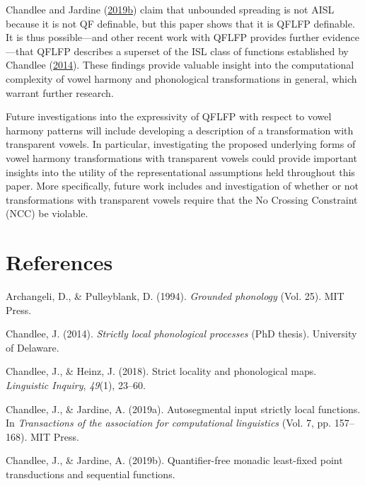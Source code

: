 \documentclass[,doc,floatsintext]{apa6}
\theoremstyle{definition}
\theoremstyle{definition}
\theoremstyle{definition}
\theoremstyle{remark}
\begin{document}
Chandlee and Jardine
(\protect\hyperlink{ref-chandleejardine2019}{2019}\protect\hyperlink{ref-chandleejardine2019}{b})
claim that unbounded spreading is not AISL because it is not QF
definable, but this paper shows that it is QFLFP definable. It is thus
possible---and other recent work with QFLFP provides further
evidence---that QFLFP describes a superset of the ISL class of functions
established by Chandlee (\protect\hyperlink{ref-chandlee2014}{2014}).
These findings provide valuable insight into the computational
complexity of vowel harmony and phonological transformations in general,
which warrant further research.

Future investigations into the expressivity of QFLFP with respect to
vowel harmony patterns will include developing a description of a
transformation with transparent vowels. In particular, investigating the
proposed underlying forms of vowel harmony transformations with
transparent vowels could provide important insights into the utility of
the representational assumptions held throughout this paper. More
specifically, future work includes and investigation of whether or not
transformations with transparent vowels require that the No Crossing
Constraint (NCC) be violable.

\newpage

\section{References}\label{references}

\begingroup
\setlength{\parindent}{-0.5in} \setlength{\leftskip}{0.5in}

\hypertarget{refs}{}
\hypertarget{ref-archangelipulleyblank1994}{}
Archangeli, D., \& Pulleyblank, D. (1994). \emph{Grounded phonology}
(Vol. 25). MIT Press.

\hypertarget{ref-chandlee2014}{}
Chandlee, J. (2014). \emph{Strictly local phonological processes}
(PhD thesis). University of Delaware.

\hypertarget{ref-chandleeheinz2018}{}
Chandlee, J., \& Heinz, J. (2018). Strict locality and phonological
maps. \emph{Linguistic Inquiry}, \emph{49}(1), 23--60.

\hypertarget{ref-chandleejardineaisl}{}
Chandlee, J., \& Jardine, A. (2019a). Autosegmental input strictly local
functions. In \emph{Transactions of the association for computational
linguistics} (Vol. 7, pp. 157--168). MIT Press.

\hypertarget{ref-chandleejardine2019}{}
Chandlee, J., \& Jardine, A. (2019b). Quantifier-free monadic
least-fixed point transductions and sequential functions.
\end{document}
